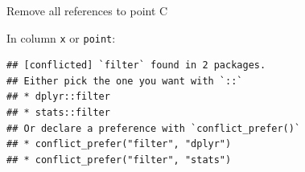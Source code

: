 \documentclass[ignorenonframetext,]{beamer}
\newenvironment{Shaded}{\begin{snugshade}}{\end{snugshade}}
\newcommand{\DecValTok}[1]{\textcolor[rgb]{0.00,0.00,0.81}{#1}}
\newcommand{\KeywordTok}[1]{\textcolor[rgb]{0.13,0.29,0.53}{\textbf{#1}}}
\newcommand{\NormalTok}[1]{#1}
\newcommand{\OperatorTok}[1]{\textcolor[rgb]{0.81,0.36,0.00}{\textbf{#1}}}
\newcommand{\StringTok}[1]{\textcolor[rgb]{0.31,0.60,0.02}{#1}}
\begin{document}
\begin{frame}[fragile]{Remove all references to point C}
\protect\hypertarget{remove-all-references-to-point-c}{}

In column \texttt{x} or \texttt{point}:

\begin{Shaded}
\end{Shaded}

\begin{verbatim}
## [conflicted] `filter` found in 2 packages.
## Either pick the one you want with `::` 
## * dplyr::filter
## * stats::filter
## Or declare a preference with `conflict_prefer()`
## * conflict_prefer("filter", "dplyr")
## * conflict_prefer("filter", "stats")
\end{verbatim}

\end{frame}
\end{document}
